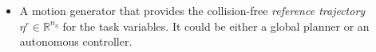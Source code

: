 \begin{itemize}
	\item A motion generator that provides the collision-free \emph{reference trajectory} $\eta^r \in \mathbb{R}^{n_\eta}$ for the task variables. It could be either a global planner or an autonomous controller.                                                                                                                                                                                                                                                                                                                                                                                                                                                                                                                                                                                                                                                                                                                                                                                                                                                                                                                                                                                                                                                                                                                                                                                                                                                                                                                                                                                                                                                                                                                                                                                                                                                                                                                                                                                                                                                                                                                                                                                                                                                                                                                                                                                                                                                                                                                                                                                                                                                                                                                                                                                                                                                         

\end{itemize}

